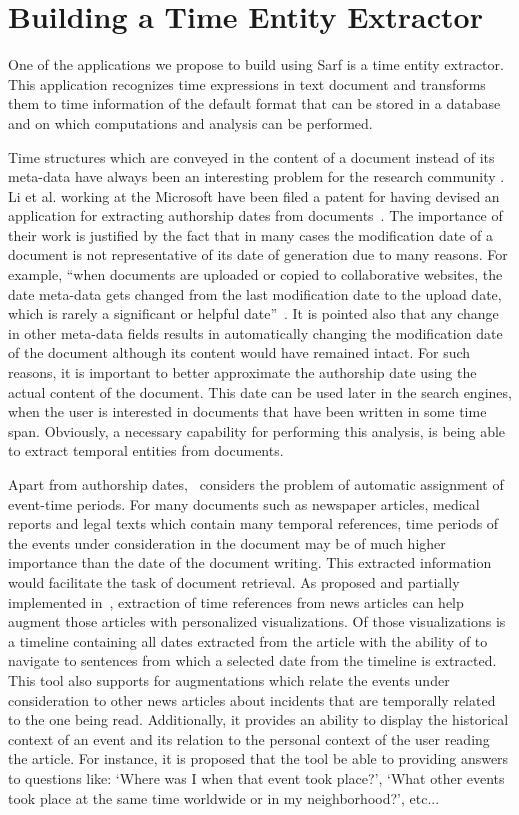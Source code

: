 \documentclass[a4,12pt]{report}
\begin{document}
\section{Building a Time Entity Extractor}

One of the applications we propose to build using Sarf is a time entity extractor. This application
recognizes time expressions in text document and transforms them to time information of the default format
that can be stored in a database and on which computations and analysis can be performed.

Time structures which are conveyed in the content of a document instead of its meta-data 
have always been an interesting problem for the research community \cite{GROSS:93,Llido:01,DSTO:05,patent:09}. 
Li et al. working at the 
Microsoft have been filed a patent for having devised an application for extracting authorship 
dates from documents~\cite{patent:09}. The importance of their work is justified by the fact that 
in many cases the modification date of a document is not representative of its date of generation due 
to many reasons. For example, ``when documents are uploaded or copied to
collaborative websites, the date meta-data gets changed from the last modification date to the 
upload date, which is rarely a significant or helpful date''~\cite{patent:09}. It is pointed also that any change in
other meta-data fields results in automatically changing the modification date of the document although its content would have 
remained intact. For such reasons, it is important to better approximate the authorship date 
using the actual content of the document. This date can be used later in the search engines, when the user is interested 
in documents that have been written in some time span. Obviously, a necessary capability for performing this analysis, 
is being able 
to extract temporal entities from documents.

Apart from authorship dates,~\cite{Llido:01} considers the problem of automatic assignment of event-time periods.
For many documents such as newspaper articles, medical reports and legal texts which contain many temporal 
references, time periods of the events under consideration in the document may be of much higher importance than 
the date of the document writing. This extracted information would facilitate the task of document retrieval.
As proposed and partially implemented in~\cite{Koen:00}, extraction of time references from news articles can help
augment those articles with personalized visualizations. Of those visualizations is a timeline containing all dates
extracted from the article with the ability of to navigate to sentences from which a selected date from the timeline 
is extracted. This tool also supports for augmentations which relate the events under consideration to
other news articles about incidents that are temporally
related to the one being read. Additionally, it provides an ability to display the historical context of an event and its relation
to the personal context of the user reading the article. For instance, it is proposed that the tool
be able to providing answers to questions like: `Where was I when that event took place?', `What other events took place
at the same time worldwide or in my neighborhood?', etc... 
\end{document}
